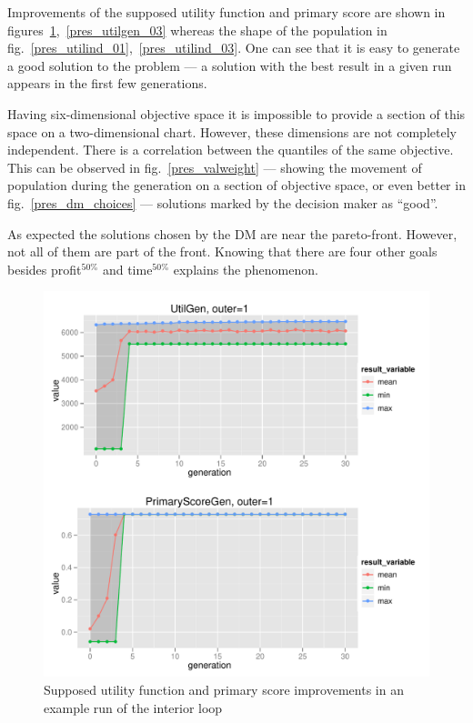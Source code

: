 Improvements of the supposed utility function and primary score are shown in
figures~\ref{pres_utilgen_01},~\ref{pres_utilgen_03} whereas the shape of the
population in fig.~\ref{pres_utilind_01},~\ref{pres_utilind_03}. One can see
that it is easy to generate a good solution to the problem --- a solution with
the best result in a given run appears in the first few generations.

Having six-dimensional objective space it is impossible to provide a section
of this space on a two-dimensional chart. However, these dimensions are not
completely independent. There is a correlation between the quantiles of the
same objective. This can be observed in fig.~\ref{pres_valweight} --- showing
the movement of population during the generation on a section of objective
space, or even better in fig.~\ref{pres_dm_choices} --- solutions marked by the
decision maker as ``good''.

As expected the solutions chosen by the DM are near the pareto-front. However,
not all of them are part of the front. Knowing that there are four other goals
besides profit$^{50\%}$ and time$^{50\%}$ explains the phenomenon.

\begin{figure}
  \centering
  \includegraphics[width=1\textwidth]{exp/uncert/pres_utilgen_01}
  \caption{Supposed utility function and primary score improvements in an
    example run of the interior loop}
  \label{pres_utilgen_01}
\end{figure}

